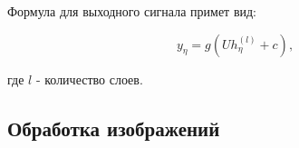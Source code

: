 \documentclass[14pt]{article}
\begin{document}
Формула для выходного сигнала примет вид:

\begin{equation}
y_\eta=g(Uh_\eta^{(l)} + c),
\end{equation}


где $l$ - количество слоев.
\subsection{Обработка изображений}


\section{}
\end{document}
